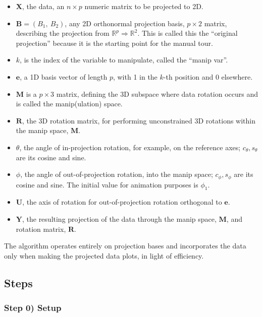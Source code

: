 \documentclass{template/monashthesis}
\begin{document}
\begin{itemize}
\item
  \(\textbf{X}\), the data, an \(n \times p\) numeric matrix to be projected to 2D.
\item
  \(\textbf{B} = (B_1,~ B_2)\), any 2D orthonormal projection basis, \(p \times 2\) matrix, describing the projection from \(\mathbb{R}^p \Rightarrow \mathbb{R}^2\). This is called this the ``original projection'' because it is the starting point for the manual tour.
\item
  \(k\), is the index of the variable to manipulate, called the ``manip var''.
\item
  \(\textbf{e}\), a 1D basis vector of length \(p\), with 1 in the \(k\)-th position and 0 elsewhere.
\item
  \(\textbf{M}\) is a \(p \times 3\) matrix, defining the 3D subspace where data rotation occurs and is called the manip(ulation) space.
\item
  \(\textbf{R}\), the 3D rotation matrix, for performing unconstrained 3D rotations within the manip space, \(\textbf{M}\).
\item
  \(\theta\), the angle of in-projection rotation, for example, on the reference axes; \(c_\theta, s_\theta\) are its cosine and sine.
\item
  \(\phi\), the angle of out-of-projection rotation, into the manip space; \(c_\phi, s_\phi\) are its cosine and sine. The initial value for animation purposes is \(\phi_1\).
\item
  \(\textbf{U}\), the axis of rotation for out-of-projection rotation orthogonal to \(\textbf{e}\).
\item
  \(\textbf{Y}\), the resulting projection of the data through the manip space, \(\textbf{M}\), and rotation matrix, \(\textbf{R}\).
\end{itemize}

The algorithm operates entirely on projection bases and incorporates the data only when making the projected data plots, in light of efficiency.

\hypertarget{steps}{%
\subsection{Steps}\label{steps}}

\hypertarget{step-0-setup}{%
\subsubsection{Step 0) Setup}\label{step-0-setup}}
\end{document}
